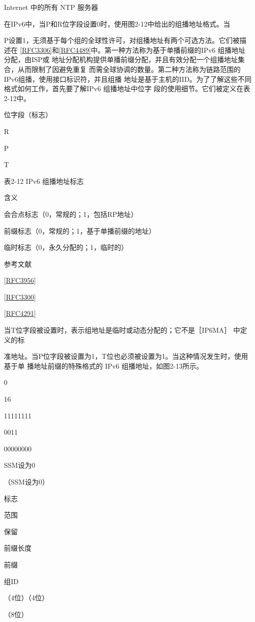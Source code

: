 Internet 中的所有 NTP 服务器

在IPv6中，当P和R位字段设置0时，使用图2-12中给出的组播地址格式。当

P设置1，无须基于每个组的全球性许可，对组播地址有两个可选方法。它们被描述在
\href{https://www.rfc-editor.org/rfc/rfc3306}{[RFC3306]}和\href{https://www.rfc-editor.org/rfc/rfc4489}{[RFC4489]}中。第一种方法称为基于单播前缀的IPv6 组播地址分配，由ISP或
地址分配机构提供单播前缀分配，并且有效分配一个组播地址集合，从而限制了因避免重复
而需全球协调的数量。第二种方法称为链路范围的IPv6组播，使用接口标识符，并且组播
地址是基于主机的IID。为了了解这些不同格式如何工作，首先要了解IPv6 组播地址中位字
段的使用细节。它们被定义在表2-12中。

位字段（标志）

R

P

T

表2-12 IPv6 组播地址标志

含义

会合点标志（0，常规的；1，包括RP地址）

前缀标志（0，常规的；1，基于单播前缀的地址）

临时标志（0，永久分配的；1，临时的）

参考文献

\href{https://www.rfc-editor.org/rfc/rfc3956}{[RFC3956]}

\href{https://www.rfc-editor.org/rfc/rfc3300}{[RFC3300]}

\href{https://www.rfc-editor.org/rfc/rfc4291}{[RFC4291]}

当T位字段被设置时，表示组地址是临时或动态分配的；它不是［IP6MA］ 中定义的标

准地址。当P位字段被设置为1，T位也必须被设置为1。当这种情况发生时，使用基于单
播地址前缀的特殊格式的 IPv6 组播地址，如图2-13所示。

0

16

11111111

0011

00000000

SSM设为0

（SSM设为0）

标志

范围

保留

前缀长度

前缀

组ID

（4位）（4位）

（8位）

